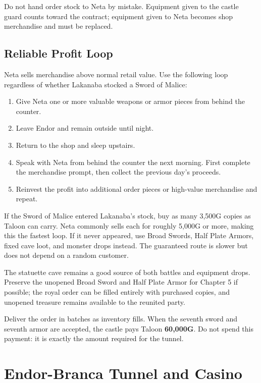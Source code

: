 \documentclass[
  american,
  10pt,
  letterpaper,
  oneside,
  open=any]{scrreprt}
\providecommand{\tightlist}{%
  \setlength{\itemsep}{0pt}\setlength{\parskip}{0pt}}
\begin{document}
Do not hand order stock to Neta by mistake. Equipment given to the
castle guard counts toward the contract; equipment given to Neta becomes
shop merchandise and must be replaced.

\subsection{Reliable Profit Loop}\label{reliable-profit-loop}

Neta sells merchandise above normal retail value. Use the following loop
regardless of whether Lakanaba stocked a Sword of Malice:

\begin{enumerate}
\def\labelenumi{\arabic{enumi}.}
\tightlist
\item
  Give Neta one or more valuable weapons or armor pieces from behind the
  counter.
\item
  Leave Endor and remain outside until night.
\item
  Return to the shop and sleep upstairs.
\item
  Speak with Neta from behind the counter the next morning. First
  complete the merchandise prompt, then collect the previous day's
  proceeds.
\item
  Reinvest the profit into additional order pieces or high-value
  merchandise and repeat.
\end{enumerate}

If the Sword of Malice entered Lakanaba's stock, buy as many 3,500G
copies as Taloon can carry. Neta commonly sells each for roughly 5,000G
or more, making this the fastest loop. If it never appeared, use Broad
Swords, Half Plate Armors, fixed cave loot, and monster drops instead.
The guaranteed route is slower but does not depend on a random customer.

The statuette cave remains a good source of both battles and equipment
drops. Preserve the unopened Broad Sword and Half Plate Armor for
Chapter 5 if possible; the royal order can be filled entirely with
purchased copies, and unopened treasure remains available to the
reunited party.

Deliver the order in batches as inventory fills. When the seventh sword
and seventh armor are accepted, the castle pays Taloon \textbf{60,000G}.
Do not spend this payment: it is exactly the amount required for the
tunnel.

\section{Endor-Branca Tunnel and
Casino}\label{endor-branca-tunnel-and-casino}
\end{document}
